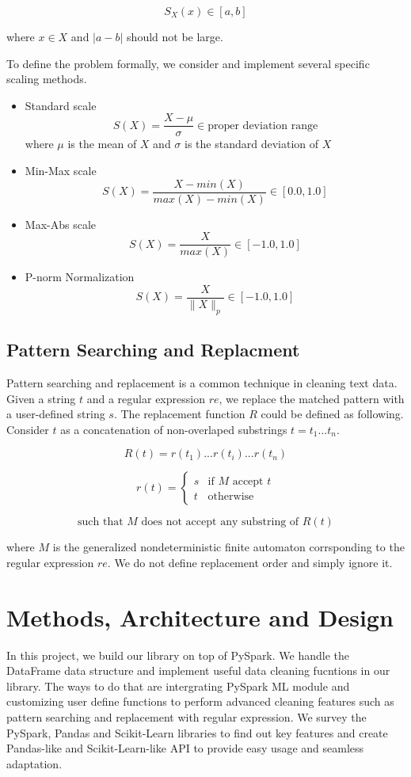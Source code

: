 \documentclass[sigconf]{acmart}
\begin{document}
\[ S_X(x) \in [a, b]\] 

where $x \in X$ and $|a - b|$ should not be large.

To define the problem formally, we consider and implement several specific scaling methods.
\begin{itemize}
	\item{Standard scale}
		\[ S(X) = \dfrac{X-\mu}{\sigma} \in \text{proper deviation range}\]
		where $\mu$ is the mean of $X$ and $\sigma$ is the standard deviation of $X$
	\item{Min-Max scale}
		\[ S(X) = \dfrac{X-min(X)}{max(X) - min(X)}\in [0.0, 1.0] \]
	\item{Max-Abs scale}
		\[ S(X) = \dfrac{X}{max(X)} \in [-1.0, 1.0] \]
	\item{P-norm Normalization}
		\[ S(X) = \dfrac{X}{\|X\|_{p}} \in [-1.0, 1.0]\]
\end{itemize}

\subsection{Pattern Searching and Replacment}
Pattern searching and replacement is a common technique in cleaning text data. Given a string $t$ and a regular expression\cite{theory_com} $re$, we replace the matched pattern with a user-defined string $s$. The replacement function $R$ could be defined as following.
Consider $t$ as a concatenation of non-overlaped substrings $t = t_1...t_n$.

\[ R(t) =  r(t_1)...r(t_i)...r(t_n)\]

\[r(t) = \begin{cases} s & \text{if $M$ accept $t$} \\ t & \text{otherwise} \end{cases}\]

\[\text{such that $M$ does not accept any substring of } R(t)\]

where $M$ is the generalized nondeterministic finite automaton\cite{theory_com} corrsponding to the regular expression $re$. We do not define replacement order and simply ignore it.


\section{Methods, Architecture and Design}
In this project, we build our library on top of PySpark. We handle the DataFrame data structure and implement useful data cleaning fucntions in our library. The ways to do that are intergrating PySpark ML module and customizing user define functions to perform advanced cleaning features such as pattern searching and replacement with regular expression. We survey the PySpark\cite{pyspark}, Pandas\cite{pandas} and Scikit-Learn\cite{scikit-learn} libraries to find out key features and create Pandas-like and Scikit-Learn-like API to provide easy usage and seamless adaptation.
\end{document}
